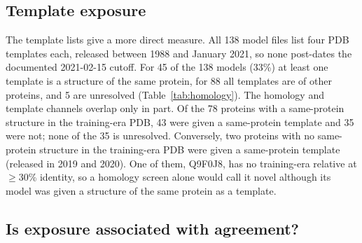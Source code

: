 \documentclass{article}
\begin{document}
\subsection{Template exposure}
\label{sec:tmplexp}

The template lists give a more direct measure. All 138 model files list four
PDB templates each, released between 1988 and January 2021, so none
post-dates the documented 2021-02-15 cutoff. For 45 of the 138 models
(33\%) at least one template is a structure of the same protein, for 88 all
templates are of other proteins, and 5 are unresolved (Table~\ref{tab:homology}). The
homology and template channels overlap only in part. Of the 78 proteins with
a same-protein structure in the training-era PDB, 43 were given a
same-protein template and 35 were not; none of the 35 is unresolved. Conversely, two proteins with no
same-protein structure in the training-era PDB were given a same-protein
template (released in 2019 and 2020). One of them, Q9F0J8, has no
training-era relative at $\ge$30\% identity, so a homology screen alone
would call it novel although its model was given a structure of the same
protein as a template.

\subsection{Is exposure associated with agreement?}
\label{sec:effect}
\end{document}
